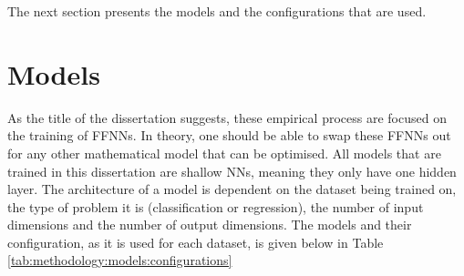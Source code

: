 The next section presents the models and the configurations that are used.


\section{Models}
\label{sec:methodology:model}

As the title of the dissertation suggests, these empirical process are focused on the training of \acp{FFNN}. In theory, one should be able to swap these \acp{FFNN} out for any other mathematical model that can be optimised. All models that are trained in this dissertation are shallow \acp{NN}, meaning they only have one hidden layer. The architecture of a model is dependent on the dataset being trained on, the type of problem it is (classification or regression), the number of input dimensions and the number of output dimensions. The models and their configuration, as it is used for each dataset, is given below in Table \ref{tab:methodology:models:configurations}


